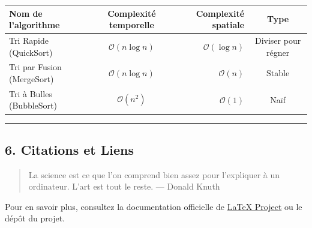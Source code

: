 \documentclass[11pt,a4paper]{article}
\begin{document}
\begin{table}[htbp]
\centering
\begin{tabular}{|l|c|r|c|}
\hline
\textbf{Nom de l'algorithme} & \textbf{Complexité temporelle} & \textbf{Complexité spatiale} & \textbf{Type} \\ \hline
Tri Rapide (QuickSort) & $\mathcal{O}(n \log n)$ & $\mathcal{O}(\log n)$ & Diviser pour régner \\ \hline
Tri par Fusion (MergeSort) & $\mathcal{O}(n \log n)$ & $\mathcal{O}(n)$ & Stable \\ \hline
Tri à Bulles (BubbleSort) & $\mathcal{O}(n^2)$ & $\mathcal{O}(1)$ & Naïf \\ \hline
\end{tabular}
\end{table}

\noindent\rule{\linewidth}{0.4pt}

\subsection{6. Citations et Liens}

\begin{quote}
La science est ce que l'on comprend bien assez pour l'expliquer à un ordinateur. L'art est tout le reste. — Donald Knuth
\end{quote}

Pour en savoir plus, consultez la documentation officielle de \href{https://www.latex-project.org}{LaTeX Project} ou le dépôt du projet.
\end{document}

